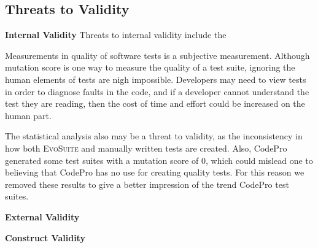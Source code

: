 \subsection{Threats to Validity}
\noindent \textbf{Internal Validity}
Threats to internal validity include the 

Measurements in quality of software tests is a subjective measurement. Although mutation score is one way to measure the quality of a test suite, ignoring the human elements of tests are nigh impossible. Developers may need to view tests in order to diagnose faults in the code, and if a developer cannot understand the test they are reading, then the cost of time and effort could be increased on the human part.

The statistical analysis also may be a threat to validity, as the inconsistency in how both \textsc{EvoSuite} and manually written tests are created. Also, CodePro generated some test suites with a mutation score of 0, which could mislead one to believing that CodePro has no use for creating quality tests. For this reason we removed these results to give a better impression of the trend CodePro test suites.

\noindent \textbf{External Validity}

\noindent \textbf{Construct Validity}

